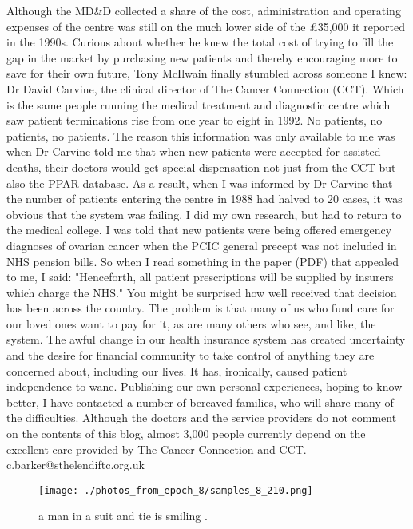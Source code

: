 \documentclass{article}%
\begin{document}
Although the MD\&D collected a share of the cost, administration and operating expenses of the centre was still on the much lower side of the £35,000 it reported in the 1990s.\newline%
Curious about whether he knew the total cost of trying to fill the gap in the market by purchasing new patients and thereby encouraging more to save for their own future, Tony McIlwain finally stumbled across someone I knew: Dr David Carvine, the clinical director of The Cancer Connection (CCT).\newline%
Which is the same people running the medical treatment and diagnostic centre which saw patient terminations rise from one year to eight in 1992.\newline%
No patients, no patients, no patients. The reason this information was only available to me was when Dr Carvine told me that when new patients were accepted for assisted deaths, their doctors would get special dispensation not just from the CCT but also the PPAR database.\newline%
As a result, when I was informed by Dr Carvine that the number of patients entering the centre in 1988 had halved to 20 cases, it was obvious that the system was failing.\newline%
I did my own research, but had to return to the medical college. I was told that new patients were being offered emergency diagnoses of ovarian cancer when the PCIC general precept was not included in NHS pension bills.\newline%
So when I read something in the paper (PDF) that appealed to me, I said: "Henceforth, all patient prescriptions will be supplied by insurers which charge the NHS."\newline%
You might be surprised how well received that decision has been across the country.\newline%
The problem is that many of us who fund care for our loved ones want to pay for it, as are many others who see, and like, the system.\newline%
The awful change in our health insurance system has created uncertainty and the desire for financial community to take control of anything they are concerned about, including our lives. It has, ironically, caused patient independence to wane.\newline%
Publishing our own personal experiences, hoping to know better, I have contacted a number of bereaved families, who will share many of the difficulties.\newline%
Although the doctors and the service providers do not comment on the contents of this blog, almost 3,000 people currently depend on the excellent care provided by The Cancer Connection and CCT.\newline%
c.barker@sthelendiftc.org.uk\newline%

%


\begin{figure}[h!]%
\centering%
\texttt{[image: ./photos\_from\_epoch\_8/samples\_8\_210.png]}%
\caption{a man in a suit and tie is smiling .}%
\end{figure}

%
\end{document}
